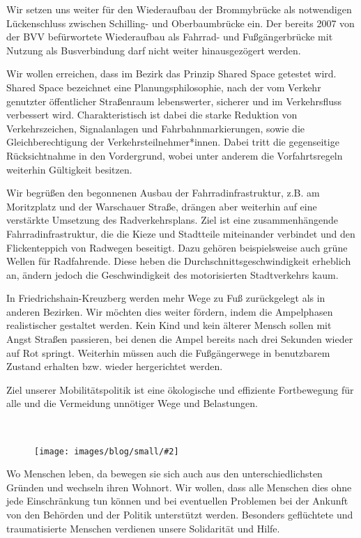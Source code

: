 \documentclass[a4paper,10pt]{article}
\newcommand{\mysection}[1]{{\vspace{1cm}\noindent\color{gray}{\ttfamily\LARGE\raggedright #1}\\\medskip}}
\newcommand{\abschnitt}[2]{%
\mysection{\raggedright #1}%
\begin{figure}[t]%
\vspace*{-2.7cm}%
\hspace*{-2.1cm}%
\texttt{[image: images/blog/small/\#2]} %
\end{figure}%
}
\begin{document}
Wir setzen uns weiter für den Wiederaufbau der Brommybrücke als
notwendigen Lückenschluss zwischen Schilling- und Oberbaumbrücke ein.
Der bereits 2007 von der BVV befürwortete Wiederaufbau als Fahrrad- und
Fußgängerbrücke mit Nutzung als Busverbindung darf nicht weiter
hinausgezögert werden.

Wir wollen erreichen, dass im Bezirk das Prinzip {\glqq}Shared Space{\grqq}
getestet wird. Shared Space bezeichnet eine Planungsphilosophie, nach
der vom Verkehr genutzter öffentlicher Straßenraum lebenswerter,
sicherer und im Verkehrsfluss verbessert wird. Charakteristisch ist
dabei die starke Reduktion von Verkehrszeichen, Signalanlagen und
Fahrbahnmarkierungen, sowie die Gleichberechtigung der
Verkehrsteilnehmer*innen. Dabei tritt die gegenseitige Rücksichtnahme in
den Vordergrund, wobei unter anderem die Vorfahrtsregeln weiterhin
Gültigkeit besitzen.

Wir begrüßen den begonnenen Ausbau der Fahrrad\-infrastruktur, z.B. am
Moritzplatz und der Warschauer Straße, drängen aber weiterhin auf eine
verstärkte Umsetzung des Radverkehrsplans. Ziel ist eine
zusammenhängende Fahrradinfrastruktur, die die Kieze und Stadtteile
miteinander verbindet und den Flickenteppich von Radwegen beseitigt.
Dazu gehören beispielsweise auch grüne Wellen für Radfahrende. Diese
heben die Durchschnittsgeschwindigkeit erheblich an, ändern jedoch die
Geschwindigkeit des motorisierten Stadtverkehrs kaum.


\enlargethispage{2em}
In Friedrichshain-Kreuzberg werden mehr Wege zu Fuß zurückgelegt als in
anderen Bezirken. Wir möchten dies weiter fördern, indem die Ampelphasen
realistischer gestaltet werden. Kein Kind und kein älterer Mensch sollen
mit Angst Straßen passieren, bei denen die Ampel bereits nach drei
Sekunden wieder auf Rot springt. Weiterhin müssen auch die Fußgängerwege
in benutzbarem Zustand erhalten bzw. wieder hergerichtet werden.

Ziel unserer Mobilitätspolitik ist eine ökologische und effiziente
Fortbewegung für alle und die Vermeidung unnötiger Wege und Belastungen.

\clearpage
\abschnitt{Migration}{plakat_gcar}

Wo Menschen leben, da bewegen sie sich auch aus den unterschiedlichsten
Gründen und wechseln ihren Wohnort. Wir wollen, dass alle Menschen dies
ohne jede Einschränkung tun können und bei eventuellen Problemen bei der
Ankunft von den Behörden und der Politik unterstützt werden. Besonders
geflüchtete und traumatisierte Menschen verdienen unsere Solidarität und
Hilfe.
\end{document}
